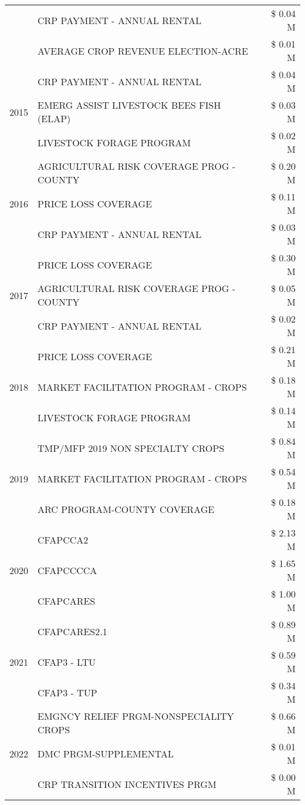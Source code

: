 \begin{tabular}{llr}
 & CRP PAYMENT - ANNUAL RENTAL & \$ 0.04 M \\
 & AVERAGE CROP REVENUE ELECTION-ACRE & \$ 0.01 M \\
\cline{1-3}
\multirow[t]{3}{*}{2015} & CRP PAYMENT - ANNUAL RENTAL & \$ 0.04 M \\
 & EMERG ASSIST LIVESTOCK BEES FISH (ELAP) & \$ 0.03 M \\
 & LIVESTOCK FORAGE PROGRAM & \$ 0.02 M \\
\cline{1-3}
\multirow[t]{3}{*}{2016} & AGRICULTURAL RISK COVERAGE PROG - COUNTY & \$ 0.20 M \\
 & PRICE LOSS COVERAGE & \$ 0.11 M \\
 & CRP PAYMENT - ANNUAL RENTAL & \$ 0.03 M \\
\cline{1-3}
\multirow[t]{3}{*}{2017} & PRICE LOSS COVERAGE & \$ 0.30 M \\
 & AGRICULTURAL RISK COVERAGE PROG - COUNTY & \$ 0.05 M \\
 & CRP PAYMENT - ANNUAL RENTAL & \$ 0.02 M \\
\cline{1-3}
\multirow[t]{3}{*}{2018} & PRICE LOSS COVERAGE & \$ 0.21 M \\
 & MARKET FACILITATION PROGRAM - CROPS & \$ 0.18 M \\
 & LIVESTOCK FORAGE PROGRAM & \$ 0.14 M \\
\cline{1-3}
\multirow[t]{3}{*}{2019} & TMP/MFP 2019 NON SPECIALTY CROPS & \$ 0.84 M \\
 & MARKET FACILITATION PROGRAM - CROPS & \$ 0.54 M \\
 & ARC PROGRAM-COUNTY COVERAGE & \$ 0.18 M \\
\cline{1-3}
\multirow[t]{3}{*}{2020} & CFAPCCA2 & \$ 2.13 M \\
 & CFAPCCCCA & \$ 1.65 M \\
 & CFAPCARES & \$ 1.00 M \\
\cline{1-3}
\multirow[t]{3}{*}{2021} & CFAPCARES2.1 & \$ 0.89 M \\
 & CFAP3 - LTU & \$ 0.59 M \\
 & CFAP3 - TUP & \$ 0.34 M \\
\cline{1-3}
\multirow[t]{3}{*}{2022} & EMGNCY RELIEF PRGM-NONSPECIALITY CROPS & \$ 0.66 M \\
 & DMC PRGM-SUPPLEMENTAL & \$ 0.01 M \\
 & CRP TRANSITION INCENTIVES PRGM & \$ 0.00 M \\
\cline{1-3}
\bottomrule
\end{tabular}
